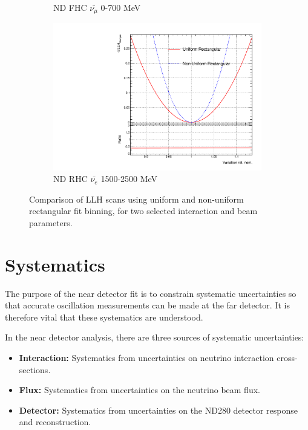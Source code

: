 \begin{figure}[h]
\begin{subfigure}{.49\textwidth}
  \caption{ND FHC $\bar{\nu_{\mu}}$ 0-700 MeV}
  \label{fig:b_18_sampolyLLH}
\end{subfigure}
\begin{subfigure}{.49\textwidth}
  \centering
  \includegraphics[width=0.95\linewidth]{figs/b_40_sampolyLLH}
  \caption{ND RHC $\bar{\nu_{e}}$ 1500-2500 MeV}
  \label{fig:b_40_sampolyLLH}
\end{subfigure}
\caption{Comparison of LLH scans using uniform and non-uniform rectangular fit binning, for two selected interaction and beam parameters.}
\label{fig:polyllhscans}
\end{figure}


\section{Systematics}\label{sec:syst}

The purpose of the near detector fit is to constrain systematic uncertainties so that accurate oscillation measurements can be made at the far detector. It is therefore vital that these systematics are understood. 

In the near detector analysis, there are three sources of systematic uncertainties: 

\begin{itemize}

\item \textbf{Interaction: } Systematics from uncertainties on neutrino interaction cross-sections.

\item \textbf{Flux: } Systematics from uncertainties on the neutrino beam flux.

\item \textbf{Detector: } Systematics from uncertainties on the ND280 detector response and reconstruction.

\end{itemize}

